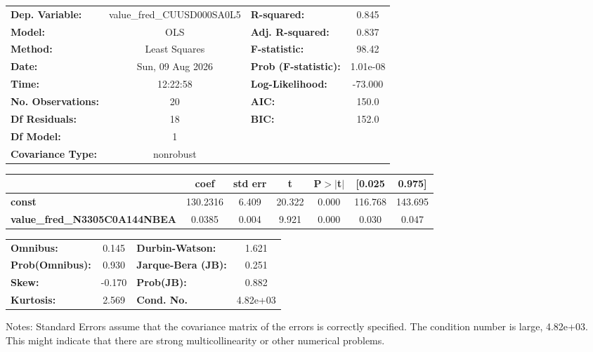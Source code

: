 \begin{center}
\begin{tabular}{lclc}
\toprule
\textbf{Dep. Variable:}               & value\_fred\_CUUSD000SA0L5 & \textbf{  R-squared:         } &     0.845   \\
\textbf{Model:}                       &            OLS             & \textbf{  Adj. R-squared:    } &     0.837   \\
\textbf{Method:}                      &       Least Squares        & \textbf{  F-statistic:       } &     98.42   \\
\textbf{Date:}                        &      Sun, 09 Aug 2026      & \textbf{  Prob (F-statistic):} &  1.01e-08   \\
\textbf{Time:}                        &          12:22:58          & \textbf{  Log-Likelihood:    } &   -73.000   \\
\textbf{No. Observations:}            &               20           & \textbf{  AIC:               } &     150.0   \\
\textbf{Df Residuals:}                &               18           & \textbf{  BIC:               } &     152.0   \\
\textbf{Df Model:}                    &                1           & \textbf{                     } &             \\
\textbf{Covariance Type:}             &         nonrobust          & \textbf{                     } &             \\
\bottomrule
\end{tabular}
\begin{tabular}{lcccccc}
                                      & \textbf{coef} & \textbf{std err} & \textbf{t} & \textbf{P$> |$t$|$} & \textbf{[0.025} & \textbf{0.975]}  \\
\midrule
\textbf{const}                        &     130.2316  &        6.409     &    20.322  &         0.000        &      116.768    &      143.695     \\
\textbf{value\_fred\_N3305C0A144NBEA} &       0.0385  &        0.004     &     9.921  &         0.000        &        0.030    &        0.047     \\
\bottomrule
\end{tabular}
\begin{tabular}{lclc}
\textbf{Omnibus:}       &  0.145 & \textbf{  Durbin-Watson:     } &    1.621  \\
\textbf{Prob(Omnibus):} &  0.930 & \textbf{  Jarque-Bera (JB):  } &    0.251  \\
\textbf{Skew:}          & -0.170 & \textbf{  Prob(JB):          } &    0.882  \\
\textbf{Kurtosis:}      &  2.569 & \textbf{  Cond. No.          } & 4.82e+03  \\
\bottomrule
\end{tabular}
\end{center}

Notes: \newline
 [1] Standard Errors assume that the covariance matrix of the errors is correctly specified. \newline
 [2] The condition number is large, 4.82e+03. This might indicate that there are \newline
 strong multicollinearity or other numerical problems.